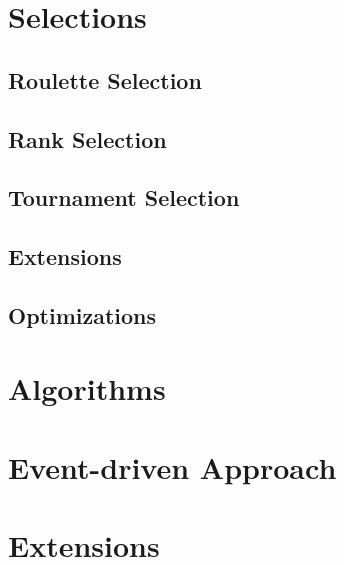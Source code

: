 \section{Selections}
\todo

\subsection{Roulette Selection}
\todo

\subsection{Rank Selection}
\todo

\subsection{Tournament Selection}
\todo

\subsection{Extensions}
\todo

\subsection{Optimizations}
\todo

\section{Algorithms}
\todo

\section{Event-driven Approach}
\todo

\section{Extensions}
\todo
